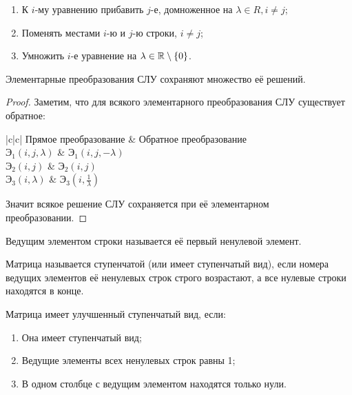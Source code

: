 \documentclass[12pt]{article}
\begin{document}
\begin{definition}
	\hfill
	\begin{center}
		\begin{minipage}{0.7\textwidth}
			\begin{enumerate}[itemsep=0pt]
				\item К $i$-му уравнению прибавить $j$-е, домноженное на $\lambda
					\in R, i \neq j$;
				\item Поменять местами $i$-ю и $j$-ю строки, $i \neq j$;
				\item Умножить $i$-е уравнение на $\lambda \in \mathbb{R} \setminus \{0\}$.
			\end{enumerate}
		\end{minipage}
	\end{center}
\end{definition}
\begin{lemma}
	Элементарные преобразования СЛУ сохраняют множество её решений.
	\begin{proof}
		Заметим, что для всякого элементарного преобразования СЛУ
		существует обратное:
		\begin{center}
			\begin{tblr}{|c|c|}
				\hline
				Прямое преобразование & Обратное преобразование\\
				\hline
				Э$_1(i, j, \lambda)$ & Э$_1(i, j, -\lambda)$\\
				Э$_2(i, j)$ & Э$_2(i, j)$\\
				Э$_3(i, \lambda)$ & Э$_3(i, \frac{1}{\lambda})$\\
				\hline
			\end{tblr}
		\end{center}
		Значит всякое решение СЛУ сохраняется при её элементарном преобразовании.
	\end{proof}
\end{lemma}
\begin{definition}
	Ведущим элементом строки называется её первый ненулевой элемент.
\end{definition}
\begin{definition}
	Матрица называется ступенчатой (или имеет ступенчатый вид), если
	номера ведущих элементов её ненулевых строк строго возрастают, а все
	нулевые строки находятся в конце.
\end{definition}
\begin{definition}
	Матрица имеет улучшенный ступенчатый вид, если:
	\begin{center}
		\begin{minipage}{0.71\textwidth}
			\begin{enumerate}[itemsep=0pt]
				\item Она имеет ступенчатый вид;
				\item Ведущие элементы всех ненулевых строк равны 1;
				\item В одном столбце с ведущим элементом находятся только нули.
			\end{enumerate}
		\end{minipage}
	\end{center}
\end{definition}
\end{document}
